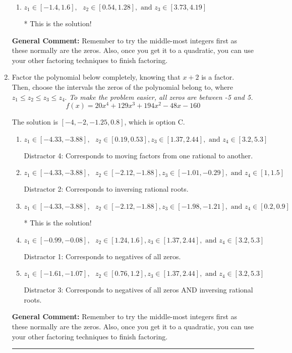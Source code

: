 \documentclass{extbook}[14pt]
\newcommand{\litem}[1]{\item #1

\rule{\textwidth}{0.4pt}}
\begin{document}
\begin{enumerate}
{\begin{enumerate}[label=\Alph*.]
 Distractor 2: Corresponds to inversing rational roots.
\item \( z_1 \in [-1.4, 1.6], \text{   }  z_2 \in [0.54, 1.28], \text{   and   } z_3 \in [3.73, 4.19] \)

* This is the solution!
\end{enumerate}

\textbf{General Comment:} Remember to try the middle-most integers first as these normally are the zeros. Also, once you get it to a quadratic, you can use your other factoring techniques to finish factoring.
}
\litem{
Factor the polynomial below completely, knowing that $x+2$ is a factor. Then, choose the intervals the zeros of the polynomial belong to, where $z_1 \leq z_2 \leq z_3 \leq z_4$. \textit{To make the problem easier, all zeros are between -5 and 5.}
\[ f(x) = 20x^{4} +129 x^{3} +194 x^{2} -48 x -160 \]

The solution is \( [-4, -2, -1.25, 0.8] \), which is option C.\begin{enumerate}[label=\Alph*.]
\item \( z_1 \in [-4.33, -3.88], \text{   }  z_2 \in [0.19, 0.53], z_3 \in [1.37, 2.44], \text{   and   } z_4 \in [3.2, 5.3] \)

 Distractor 4: Corresponds to moving factors from one rational to another.
\item \( z_1 \in [-4.33, -3.88], \text{   }  z_2 \in [-2.12, -1.88], z_3 \in [-1.01, -0.29], \text{   and   } z_4 \in [1, 1.5] \)

 Distractor 2: Corresponds to inversing rational roots.
\item \( z_1 \in [-4.33, -3.88], \text{   }  z_2 \in [-2.12, -1.88], z_3 \in [-1.98, -1.21], \text{   and   } z_4 \in [0.2, 0.9] \)

* This is the solution!
\item \( z_1 \in [-0.99, -0.08], \text{   }  z_2 \in [1.24, 1.6], z_3 \in [1.37, 2.44], \text{   and   } z_4 \in [3.2, 5.3] \)

 Distractor 1: Corresponds to negatives of all zeros.
\item \( z_1 \in [-1.61, -1.07], \text{   }  z_2 \in [0.76, 1.2], z_3 \in [1.37, 2.44], \text{   and   } z_4 \in [3.2, 5.3] \)

 Distractor 3: Corresponds to negatives of all zeros AND inversing rational roots.
\end{enumerate}

\textbf{General Comment:} Remember to try the middle-most integers first as these normally are the zeros. Also, once you get it to a quadratic, you can use your other factoring techniques to finish factoring.
}
\end{enumerate}
\end{document}
